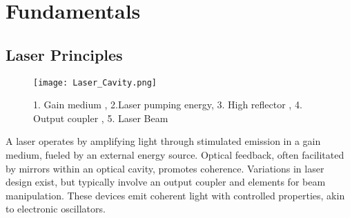 \section{Fundamentals}
\label{sec:fundamentals}

\subsection{Laser Principles}
    \begin{wrapfigure}[16]{r}[0cm]{0.4\textwidth}
        \centering
        \vspace{-\normalbaselineskip}
        \texttt{[image: Laser\_Cavity.png]}
        \vspace{-10pt}
        \caption{ 1. Gain medium , 2.Laser pumping energy, 3. High reflector , 4. Output coupler , 5. Laser Beam  \cite{Laser_cav} }
        
        \label{fig:lasercav}
    \end{wrapfigure}
    
    A laser operates by amplifying light through stimulated emission in a gain medium, fueled by an external energy source. 
    Optical feedback, often facilitated by mirrors within an optical cavity, promotes coherence. 
    Variations in laser design exist, but typically involve an output coupler and elements for beam manipulation. 
    These devices emit coherent light with controlled properties, akin to electronic oscillators. \\
